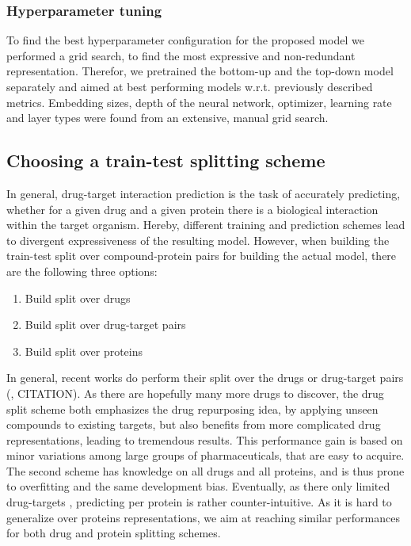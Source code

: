 \documentclass{bioinfo}
\renewcommand{\cite}{\citep}
\begin{document}
\subsubsection{Hyperparameter tuning}
To find the best hyperparameter configuration for the proposed model we performed a grid search, to find the most expressive and non-redundant representation. Therefor, we pretrained the bottom-up and the top-down model separately and aimed at best performing models w.r.t. previously described metrics. Embedding sizes, depth of the neural network, optimizer, learning rate and layer types were found from an extensive, manual grid search. 



\subsection{Choosing a train-test splitting scheme}
In general, drug-target interaction prediction is the task of accurately predicting, whether for a given drug and a given protein there is a biological interaction within the target organism. Hereby, different training and prediction schemes lead to divergent expressiveness of the resulting model. However, when building the train-test split over compound-protein pairs for building the actual model, there are the following three options:

\begin{enumerate}
	\item Build split over drugs
	\item Build split over drug-target pairs
	\item Build split over proteins
\end{enumerate} 
In general, recent works do perform their split over the drugs or drug-target pairs (\cite{Survey2018}, CITATION). As there are hopefully many more drugs to discover, the drug split scheme both emphasizes the drug repurposing idea, by applying unseen compounds to existing targets, but also benefits from more complicated drug representations, leading to tremendous results. This performance gain is based on minor variations among large groups of pharmaceuticals, that are easy to acquire. The second scheme has knowledge on all drugs and all proteins, and is thus prone to overfitting and the same development bias. Eventually, as there only limited drug-targets \citep{Overington2006}, predicting per protein is rather counter-intuitive. As it is hard to generalize over proteins representations, we aim at reaching similar performances for both drug and protein splitting schemes. \\
\end{document}
